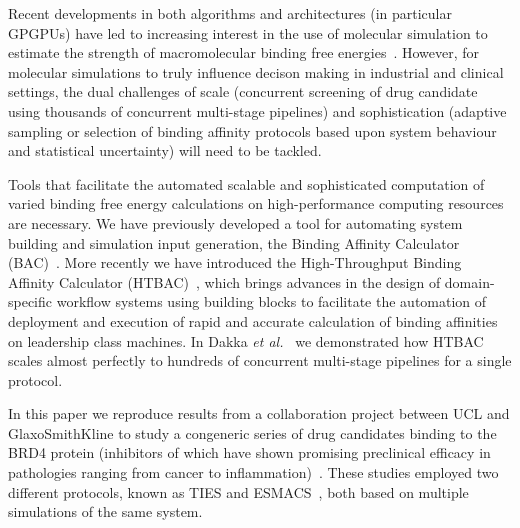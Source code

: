 Recent developments in both algorithms and architectures (in particular
GPGPUs) have led to increasing interest in the use of molecular simulation to
estimate the strength of macromolecular binding free
energies~\cite{DeVivo2016}. However, for molecular simulations to truly
influence decison making in industrial and clinical settings, the dual
challenges of scale (concurrent screening of drug candidate using thousands of
concurrent multi-stage pipelines) and sophistication (adaptive sampling or
selection of binding affinity protocols based upon system behaviour and
statistical uncertainty) will need to be tackled.


Tools that facilitate the automated scalable and sophisticated computation of
varied binding free energy calculations on high-performance computing
resources are necessary. We have previously developed a tool for automating
system building and simulation input generation, the Binding Affinity
Calculator (BAC)~\cite{Sadiq2008}. More recently we have introduced the High-Throughput Binding Affinity Calculator (HTBAC)~\cite{dakka2017}, which brings
advances in the design of domain-specific workflow systems using building
blocks to facilitate the automation of deployment and execution of rapid and
accurate calculation of binding affinities on leadership class machines. In
Dakka \textit{et al.}~\cite{dakka2017} we demonstrated how HTBAC scales almost
perfectly to hundreds of concurrent multi-stage pipelines for a single
protocol.




In this paper we reproduce results from a collaboration project between UCL
and GlaxoSmithKline to study a congeneric series of drug candidates binding to
the BRD4 protein (inhibitors of which have shown promising preclinical
efficacy in pathologies ranging from cancer to
inflammation)~\cite{Wan2017brd4}. These studies employed two different
protocols, known as TIES and ESMACS~\cite{Bhati2017}, both based on multiple
simulations of the same system.

